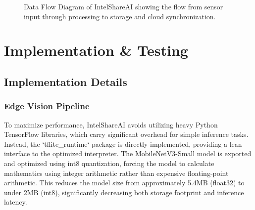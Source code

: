 \documentclass[12pt,a4paper]{report}
\begin{document}
\begin{figure}[H]
{
    }
    \caption{Data Flow Diagram of IntelShareAI showing the flow from sensor input through processing to storage and cloud synchronization.}
    \label{fig:dfd}
\end{figure}


\chapter{Implementation \& Testing}

\section{Implementation Details}

\subsection{Edge Vision Pipeline}
To maximize performance, IntelShareAI avoids utilizing heavy Python TensorFlow libraries, which carry significant overhead for simple inference tasks. Instead, the `tflite\_runtime` package is directly implemented, providing a lean interface to the optimized interpreter. The MobileNetV3-Small model is exported and optimized using int8 quantization, forcing the model to calculate mathematics using integer arithmetic rather than expensive floating-point arithmetic. This reduces the model size from approximately 5.4MB (float32) to under 2MB (int8), significantly decreasing both storage footprint and inference latency.
\end{document}
